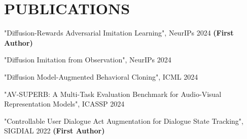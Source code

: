 \section{PUBLICATIONS}
\begin{enumerate}[label={[\arabic*]}]
  \item "Diffusion-Rewards Adversarial Imitation Learning", NeurIPs 2024 \textbf{(First Author)}
  \item "Diffusion Imitation from Observation", NeurIPs 2024
  \item "Diffusion Model-Augmented Behavioral Cloning", ICML 2024
  \item "AV-SUPERB: A Multi-Task Evaluation Benchmark for Audio-Visual Representation Models", ICASSP 2024
  \item "Controllable User Dialogue Act Augmentation for Dialogue State Tracking", SIGDIAL 2022 \textbf{(First Author)}
\end{enumerate}




